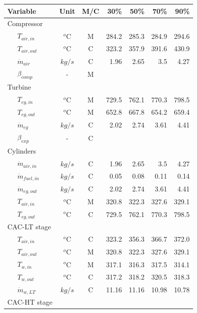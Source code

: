 \documentclass[preprint,12pt]{elsarticle}
\begin{document}
\begin{table}
	\small
	\centering
	\begin{tabular}{llccrrrr}
		\hline
		\multicolumn{2}{l}{Variable} & Unit & M/C & 30\% & 50\% & 70\% & 90\% \\
		\hline
		\multicolumn{2}{l}{Compressor} & & & & & & \\ 
		& 	$T_{air,in}$  		& $^o$C & M & 284.2 & 285.3 & 284.9 & 294.6 \\ 
		&	$T_{air,out}$  		& $^o$C & C  & 323.2 & 357.9 & 391.6 & 430.9 \\
		&	$\dot{m}_{air}$  	& $kg/s$ & C  & 1.96 & 2.65 & 3.5 & 4.27 \\
		&   $\beta_{comp}$		& - 	& M & & & &  \\
		\multicolumn{2}{l}{Turbine} & & & & & &  \\
		&	$T_{eg,in}$   		& $^o$C & M  & 729.5 & 762.1 & 770.3 & 798.5 \\
		&	$T_{eg,out}$  		& $^o$C & M  & 652.8 & 667.8 & 654.2 & 659.4 \\
		&	$\dot{m}_{eg}$  	& $kg/s$ & C  & 2.02 & 2.74 & 3.61 & 4.41 \\
		&   $\beta_{exp}$		& - 	& C & & & &  \\
		\multicolumn{2}{l}{Cylinders} & & & & & &   \\
		&	$\dot{m}_{air,in}$  & $kg/s$ & C  & 1.96 & 2.65 & 3.5 & 4.27 \\ 
		&	$\dot{m}_{fuel,in}$ & $kg/s$ & C  & 0.05 & 0.08 & 0.11 & 0.14 \\
		&	$\dot{m}_{eg,out}$  & $kg/s$ & C  & 2.02 & 2.74 & 3.61 & 4.41 \\
		&	$T_{air,in}$  		& $^o$C & M  & 320.8 & 322.3 & 327.6 & 329.1 \\
		&	$T_{eg,out}$  		& $^o$C & C  & 729.5 & 762.1 & 770.3 & 798.5 \\
		\multicolumn{2}{l}{CAC-LT stage} & & & & & &  \\
		&	$T_{air,in}$  		& $^o$C & C  & 323.2 & 356.3 & 366.7 & 372.0 \\ 
		&	$T_{air,out}$ 		& $^o$C & M  & 320.8 & 322.3 & 327.6 & 329.1 \\ 
		&	$T_{w,in}$   		& $^o$C & M  & 317.1 & 316.3 & 317.5 & 314.1 \\
		&	$T_{w,out}$   		& $^o$C & C  & 317.2 & 318.2 & 320.5 & 318.3 \\
		& 	$\dot{m}_{w,LT}$  	& $kg/s$ & C & 11.16 & 11.16 & 10.98 & 10.78 \\ 
		\multicolumn{2}{l}{CAC-HT stage} & & & & & & \\

\end{tabular}
\end{table}
\end{document}
